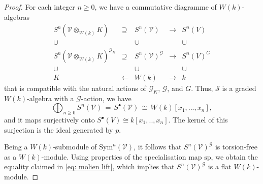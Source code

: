 \documentclass[10pt,a4paper]{amsart}
\begin{document}
\begin{proof}
For each integer $n\geq0$, we have a commutative diagramme
of $W(k)$-algebras 
$$
   \begin{array}{ccccc}
    S^n(\mathcal{V}\otimes_{W(k)}K)&\supseteq& S^n(\mathcal{V})&\to& S^n(V)\\
    \cup&& \cup && \cup\\
    S^n(\mathcal{V}\otimes_{W(k)}K)^{\mathcal{G}_K}&\supseteq& S^n(\mathcal{V})^{\mathcal{G}}&\to& S^n(V)^G\\
    \cup&& \cup && \cup \\
    K &\leftarrow& W(k) &\to& k
   \end{array}
$$
that is compatible with the natural actions of $\mathcal{G}_K$, $\mathcal{G}$, and $G$.
Thus, $\mathcal{S}$ is a graded $W(k)$-algebra with a $\mathcal{G}$-action, we have
$$
\bigoplus_{n\geq0} S^n(\mathcal{V})\,=\,S^\bullet(\mathcal{V}) \,\cong\,
W(k)[x_1,...,x_n],
$$
and it maps surjectively onto $S^\bullet(V)\cong k[x_1,..,x_n]$.
The kernel of this surjection is the ideal generated by $p$.

Being a $W(k)$-submodule of $\mathrm{Sym}^n(\mathcal{V})$, it follows
that $S^n(\mathcal{V})^{\mathcal{G}}$ is torsion-free as a $W(k)$-module.
Using properties of the specialisation map $\mathrm{sp}$, we obtain
the equality claimed in \cref{eq: molien lift},
which implies that $S^n(\mathcal{V})^{\mathcal{G}}$ is a flat $W(k)$-module.
\end{proof}
\end{document}
